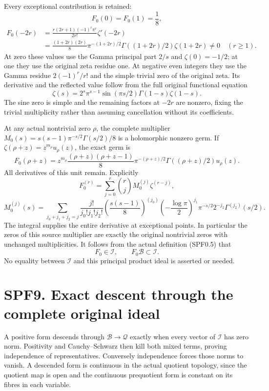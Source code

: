 Every exceptional contribution is retained: \[
F_0(0)=F_0(1)=\frac18,
\] \[
\begin{aligned}
F_0(-2r)&=\frac{r(2r+1)(-1)^r\pi^r}{2r!}\zeta'(-2r)
\\&=\frac{(1+2r)(2r)}8\pi^{-(1+2r)/2}
\Gamma((1+2r)/2)\zeta(1+2r)\ne0\quad(r\ge1).
\end{aligned}
\tag{SPF8.4}
\] At zero these values use the Gamma principal part \(2/s\) and
\(\zeta(0)=-1/2\); at one they use the original zeta residue one. At
negative even integers they use the Gamma residue \(2(-1)^r/r!\) and the
simple trivial zero of the original zeta. Its derivative and the
reflected value follow from the full original functional equation \[
\zeta(s)=2^s\pi^{s-1}\sin(\pi s/2)\Gamma(1-s)\zeta(1-s).
\tag{SPF8.5}
\] The sine zero is simple and the remaining factors at \(-2r\) are
nonzero, fixing the trivial multiplicity rather than assuming
cancellation without its coefficients.

At any actual nontrivial zero \(\rho\), the complete multiplier
\(M_0(s)=s(s-1)\pi^{-s/2}\Gamma(s/2)/8\) is a holomorphic nonzero germ.
If \(\zeta(\rho+z)=z^{m_\rho}u_\rho(z)\), the exact germ is \[
F_0(\rho+z)=z^{m_\rho}
\frac{(\rho+z)(\rho+z-1)}8
\pi^{-(\rho+z)/2}\Gamma((\rho+z)/2)u_\rho(z).
\tag{SPF8.6}
\] All derivatives of this unit remain. Explicitly \[
F_0^{(r)}=\sum_{j=0}^r\binom rj M_0^{(j)}\zeta^{(r-j)},
\] \[
M_0^{(j)}(s)=\sum_{j_0+j_1+j_2=j}
\frac{j!}{j_0!j_1!j_2!}
\left(\frac{s(s-1)}8\right)^{(j_0)}
\left(-\frac{\log\pi}2\right)^{j_1}\pi^{-s/2}
2^{-j_2}\Gamma^{(j_2)}(s/2).
\tag{SPF8.7}
\] The integral supplies the entire derivative at exceptional points. In
particular the zeros of this source multiplier are exactly the original
nontrivial zeros with unchanged multiplicities. It follows from the
actual definition (SPF0.5) that \[
F_0\in\mathcal I,\qquad F_0\mathcal B\subset\mathcal I.
\tag{SPF8.8}
\] No equality between \(\mathcal I\) and this principal product ideal
is asserted or needed.

\section{SPF9. Exact descent through the complete original
ideal}\label{spf9.-exact-descent-through-the-complete-original-ideal}

A positive form descends through \(\mathcal B\to\mathcal Q\) exactly
when every vector of \(\mathcal I\) has zero norm. Positivity and
Cauchy--Schwarz then kill both mixed terms, proving independence of
representatives. Conversely independence forces those norms to vanish. A
descended form is continuous in the actual quotient topology, since the
quotient map is open and the continuous prequotient form is constant on
its fibres in each variable.


